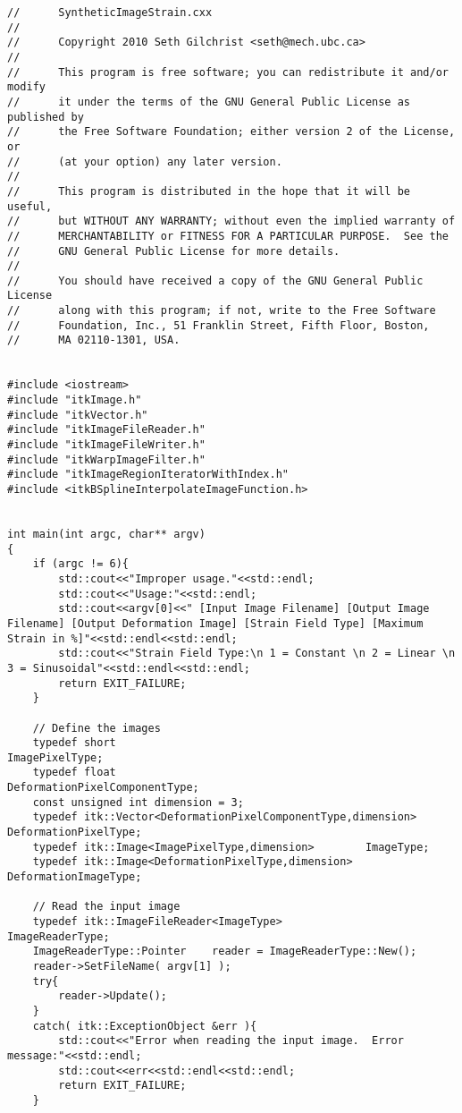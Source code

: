 \begin{lstlisting}
//      SyntheticImageStrain.cxx
//      
//      Copyright 2010 Seth Gilchrist <seth@mech.ubc.ca>
//      
//      This program is free software; you can redistribute it and/or modify
//      it under the terms of the GNU General Public License as published by
//      the Free Software Foundation; either version 2 of the License, or
//      (at your option) any later version.
//      
//      This program is distributed in the hope that it will be useful,
//      but WITHOUT ANY WARRANTY; without even the implied warranty of
//      MERCHANTABILITY or FITNESS FOR A PARTICULAR PURPOSE.  See the
//      GNU General Public License for more details.
//      
//      You should have received a copy of the GNU General Public License
//      along with this program; if not, write to the Free Software
//      Foundation, Inc., 51 Franklin Street, Fifth Floor, Boston,
//      MA 02110-1301, USA.


#include <iostream>
#include "itkImage.h"
#include "itkVector.h"
#include "itkImageFileReader.h"
#include "itkImageFileWriter.h"
#include "itkWarpImageFilter.h"
#include "itkImageRegionIteratorWithIndex.h"
#include <itkBSplineInterpolateImageFunction.h>


int main(int argc, char** argv)
{
	if (argc != 6){
		std::cout<<"Improper usage."<<std::endl;
		std::cout<<"Usage:"<<std::endl;
		std::cout<<argv[0]<<" [Input Image Filename] [Output Image Filename] [Output Deformation Image] [Strain Field Type] [Maximum Strain in %]"<<std::endl<<std::endl;
		std::cout<<"Strain Field Type:\n 1 = Constant \n 2 = Linear \n 3 = Sinusoidal"<<std::endl<<std::endl;
		return EXIT_FAILURE;
	}
	
	// Define the images
	typedef short										ImagePixelType;
	typedef float										DeformationPixelComponentType;
	const unsigned int dimension = 3;
	typedef itk::Vector<DeformationPixelComponentType,dimension>	DeformationPixelType;
	typedef itk::Image<ImagePixelType,dimension>		ImageType;
	typedef	itk::Image<DeformationPixelType,dimension>	DeformationImageType;
	
	// Read the input image
	typedef	itk::ImageFileReader<ImageType>				ImageReaderType;
	ImageReaderType::Pointer	reader = ImageReaderType::New();
	reader->SetFileName( argv[1] );
	try{
		reader->Update();
	}
	catch( itk::ExceptionObject &err ){
		std::cout<<"Error when reading the input image.  Error message:"<<std::endl;
		std::cout<<err<<std::endl<<std::endl;
		return EXIT_FAILURE;
	}
	

\end{lstlisting}
